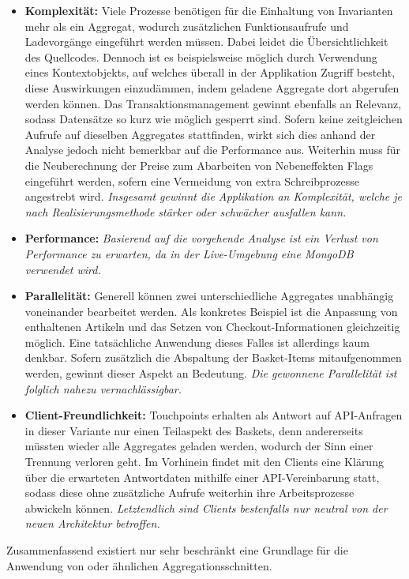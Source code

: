 \begin{itemize}[topsep=-2pt]
	\item \textbf{Komplexität: } {Viele Prozesse benötigen für die Einhaltung von Invarianten mehr als ein Aggregat, wodurch zusätzlichen Funktionsaufrufe und Ladevorgänge eingeführt werden müssen. Dabei leidet die Übersichtlichkeit des Quellcodes. Dennoch ist es beispielsweise möglich durch Verwendung eines Kontextobjekts, auf welches überall in der Applikation Zugriff besteht, diese Auswirkungen einzudämmen, indem geladene Aggregate dort abgerufen werden können. Das Transaktionsmanagement gewinnt ebenfalls an Relevanz, sodass Datensätze so kurz wie möglich gesperrt sind. Sofern keine zeitgleichen Aufrufe auf dieselben Aggregates stattfinden, wirkt sich dies anhand der Analyse jedoch nicht bemerkbar auf die Performance aus. Weiterhin muss für die Neuberechnung der Preise zum Abarbeiten von Nebeneffekten Flags eingeführt werden, sofern eine Vermeidung von extra Schreibprozesse angestrebt wird. \emph{Insgesamt gewinnt die Applikation an Komplexität, welche je nach Realisierungsmethode stärker oder schwächer ausfallen kann.}}
	
	\item \textbf{Performance: } { \emph{Basierend auf die vorgehende Analyse ist ein Verlust von Performance zu erwarten, da in der Live-Umgebung eine MongoDB verwendet wird.} }
	
	\item \textbf{Parallelität: } { Generell können zwei unterschiedliche Aggregates unabhängig voneinander bearbeitet werden. Als konkretes Beispiel ist die Anpassung von enthaltenen Artikeln und das Setzen von Checkout-Informationen gleichzeitig möglich. Eine tatsächliche Anwendung dieses Falles ist allerdings kaum denkbar. Sofern zusätzlich die Abspaltung der Basket-Items mitaufgenommen werden, gewinnt dieser Aspekt an Bedeutung. \emph{Die gewonnene Parallelität ist folglich nahezu vernachlässigbar.}}
	\item \textbf{Client-Freundlichkeit: } { Touchpoints erhalten als Antwort auf API-Anfragen in dieser Variante nur einen Teilaspekt des Baskets, denn andererseits müssten wieder alle Aggregates geladen werden, wodurch der Sinn einer Trennung verloren geht. Im Vorhinein findet mit den Clients eine Klärung über die erwarteten Antwortdaten mithilfe einer API-Vereinbarung statt, sodass diese ohne zusätzliche Aufrufe weiterhin ihre Arbeitsprozesse abwickeln können. \emph{Letztendlich sind Clients bestenfalls nur neutral von der neuen Architektur betroffen.}}
\end{itemize}

Zusammenfassend existiert nur sehr beschränkt eine Grundlage für die Anwendung von  oder ähnlichen Aggregationsschnitten.